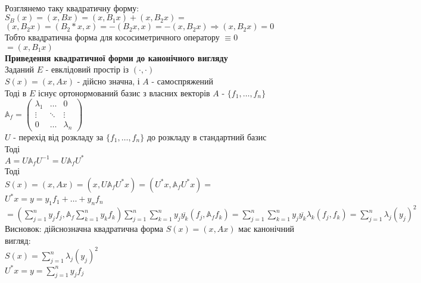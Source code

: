 \documentclass[a4paper, 10pt]{article}
\def\huge{\displaystyle}
\theoremstyle{theoremdd}
\theoremstyle{theoremdd}
\theoremstyle{theoremdd}
\theoremstyle{theoremdd}
\theoremstyle{theoremdd}
\theoremstyle{theoremdd}
\theoremstyle{theoremdd}
\theoremstyle{theoremdd}
\begin{document}
\bigskip \\
Розглянемо таку квадратичну форму:\\
$S_B(x) = (x,Bx) = (x,B_1x) + (x,B_2x) \boxed{=} $\\
$(x,B_2x) = (B_2*x,x) = -(B_2x,x) = -(x,B_2x) \Rightarrow (x,B_2x) = 0$\\
Тобто квадратична форма для кососиметричного оператору $\equiv 0$\\
$\boxed{=} (x,B_1x)$
\bigskip \\
\textbf{Приведення квадратичної форми до канонічного вигляду}\\
Заданий $E$ - евклідовий простір із $(\cdot,\cdot)$\\
$S(x) = (x,Ax)$ - дійсно значна, і $A$ - самоспряжений\\
Тоді в $E$ існує ортонормований базис з власних векторів $A$ - $\{f_1,\dots,f_n\}$\\
$\mathbb{A}_f = \begin{pmatrix}
\lambda_1 & \dots & 0 \\
\vdots & \ddots & \vdots \\
0 & \dots & \lambda_n
\end{pmatrix}$\\
$U$ - перехід від розкладу за $\{f_1,\dots,f_n\}$ до розкладу в стандартний базис\\
Тоді\\
$A = U \mathbb{A}_{f} U^{-1} = U \mathbb{A}_{f} U^{*}$\\
Тоді\\
$S(x) = (x,Ax) = (x,U \mathbb{A}_{f} U^{*} x) = (U^*x, \mathbb{A}_{f} U^{*} x) =$\\
$U^* x = y = y_1f_1 + \dots + y_nf_n$\\
$= \huge \left(\sum_{j=1}^n y_jf_j, \mathbb{A}_{f} \sum_{k=1}^n y_k f_k \right) \sum_{j=1}^n \sum_{k=1}^n y_j \overline{y_k} (f_j, \mathbb{A}_f f_k) = \sum_{j=1}^n \sum_{k=1}^n y_j \overline{y_k} \lambda_k (f_j,f_k) = \sum_{j=1}^n \lambda_j (y_j)^2$\\
Висновок: дійснозначна квадратична форма $S(x) = (x,Ax)$ має канонічний вигляд:\\
$S(x) = \huge \sum_{j=1}^n \lambda_j (y_j)^2$\\
$U^*x = y = \huge \sum_{j=1}^n y_j f_j$\\
\end{document}

